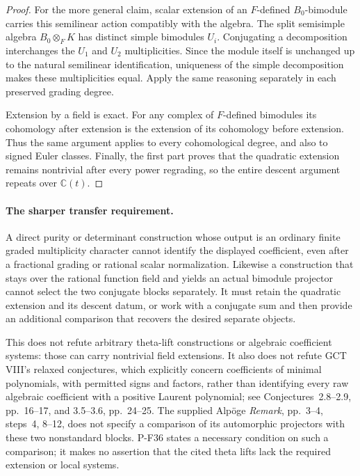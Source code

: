 \documentclass[11pt,a4paper]{article}
\begin{document}
\begin{proof}
For the more general claim, scalar extension of an $F$-defined
$B_0$-bimodule carries this semilinear action compatibly with
the algebra. The split semisimple algebra $B_0\otimes_F K$
has distinct simple bimodules $U_i$. Conjugating a decomposition
interchanges the $U_1$ and $U_2$ multiplicities. Since the module
itself is unchanged up to the natural semilinear identification,
uniqueness of the simple decomposition makes these multiplicities
equal. Apply the same reasoning separately in each preserved
grading degree.

Extension by a field is exact. For any complex of $F$-defined
bimodules its cohomology after extension is the extension of its
cohomology before extension. Thus the same argument applies to
every cohomological degree, and also to signed Euler classes.
Finally, the first part proves that the quadratic extension
remains nontrivial after every power regrading, so the entire
descent argument repeats over $\mathbb C(t)$.
\end{proof}

\paragraph{The sharper transfer requirement.}
A direct purity or determinant construction whose output is an
ordinary finite graded multiplicity character cannot identify
the displayed coefficient, even after a fractional grading or
rational scalar normalization. Likewise a construction that stays
over the rational function field and yields an actual bimodule
projector cannot select the two conjugate blocks separately.
It must retain the quadratic extension and its descent datum,
or work with a conjugate sum and then provide an additional
comparison that recovers the desired separate objects.

This does not refute arbitrary theta-lift constructions or
algebraic coefficient systems: those can carry nontrivial field
extensions. It also does not refute GCT VIII's relaxed conjectures,
which explicitly concern coefficients of minimal polynomials,
with permitted signs and factors, rather than identifying every
raw algebraic coefficient with a positive Laurent polynomial;
see Conjectures~2.8--2.9, pp.~16--17, and 3.5--3.6, pp.~24--25.
The supplied Alp\"oge \emph{Remark}, pp.~3--4, steps~4, 8--12,
does not specify a comparison of its automorphic projectors with
these two nonstandard blocks. P-F36 states a necessary condition
on such a comparison; it makes no assertion that the cited
theta lifts lack the required extension or local systems.
\end{document}

